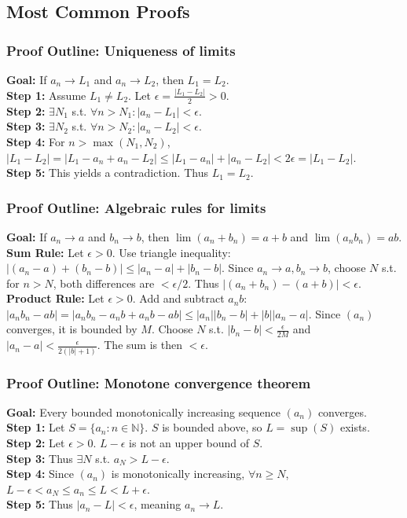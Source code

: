 \subsection{Most Common Proofs}

\subsubsection{Proof Outline: Uniqueness of limits}
\textbf{Goal:} If $a_n \to L_1$ and $a_n \to L_2$, then $L_1 = L_2$. \\
\textbf{Step 1:} Assume $L_1 \neq L_2$. Let $\epsilon = \frac{|L_1 - L_2|}{2} > 0$. \\
\textbf{Step 2:} $\exists N_1$ s.t. $\forall n > N_1: |a_n - L_1| < \epsilon$. \\
\textbf{Step 3:} $\exists N_2$ s.t. $\forall n > N_2: |a_n - L_2| < \epsilon$. \\
\textbf{Step 4:} For $n > \max(N_1, N_2)$, $|L_1 - L_2| = |L_1 - a_n + a_n - L_2| \le |L_1 - a_n| + |a_n - L_2| < 2\epsilon = |L_1 - L_2|$. \\
\textbf{Step 5:} This yields a contradiction. Thus $L_1 = L_2$.

\subsubsection{Proof Outline: Algebraic rules for limits}
\textbf{Goal:} If $a_n \to a$ and $b_n \to b$, then $\lim (a_n + b_n) = a + b$ and $\lim(a_n b_n) = ab$. \\
\textbf{Sum Rule:} Let $\epsilon > 0$. Use triangle inequality: $|(a_n - a) + (b_n - b)| \le |a_n - a| + |b_n - b|$. Since $a_n \to a, b_n \to b$, choose $N$ s.t. for $n > N$, both differences are $< \epsilon/2$. Thus $|(a_n+b_n) - (a+b)| < \epsilon$. \\
\textbf{Product Rule:} Let $\epsilon > 0$. Add and subtract $a_n b$: $|a_n b_n - ab| = |a_n b_n - a_n b + a_n b - ab| \le |a_n||b_n - b| + |b||a_n - a|$. Since $(a_n)$ converges, it is bounded by $M$. Choose $N$ s.t. $|b_n - b| < \frac{\epsilon}{2M}$ and $|a_n - a| < \frac{\epsilon}{2(|b|+1)}$. The sum is then $< \epsilon$.

\subsubsection{Proof Outline: Monotone convergence theorem}
\textbf{Goal:} Every bounded monotonically increasing sequence $(a_n)$ converges. \\
\textbf{Step 1:} Let $S = \{a_n : n \in \mathbb{N}\}$. $S$ is bounded above, so $L = \sup(S)$ exists. \\
\textbf{Step 2:} Let $\epsilon > 0$. $L - \epsilon$ is not an upper bound of $S$. \\
\textbf{Step 3:} Thus $\exists N$ s.t. $a_N > L - \epsilon$. \\
\textbf{Step 4:} Since $(a_n)$ is monotonically increasing, $\forall n \ge N$, $L - \epsilon < a_N \le a_n \le L < L + \epsilon$. \\
\textbf{Step 5:} Thus $|a_n - L| < \epsilon$, meaning $a_n \to L$.

